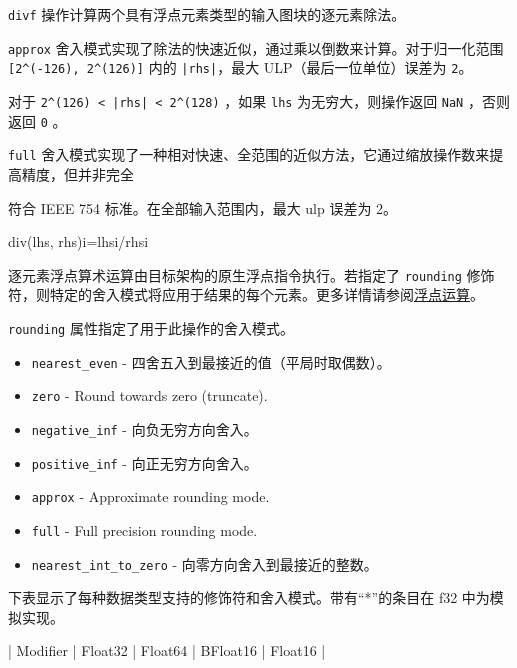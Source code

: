 \documentclass{article}
\begin{document}
\texttt{divf} 操作计算两个具有浮点元素类型的输入图块的逐元素除法。



\texttt{approx} 舍入模式实现了除法的快速近似，通过乘以倒数来计算。对于归一化范围 \texttt{[2\textasciicircum{}(-126), 2\textasciicircum{}(126)]} 内的 \texttt{|rhs|}，最大 ULP（最后一位单位）误差为 \texttt{2}。

对于 \texttt{2\textasciicircum{}(126) < |rhs| < 2\textasciicircum{}(128)} ，如果 \texttt{lhs} 为无穷大，则操作返回 \texttt{NaN} ，否则返回 \texttt{0} 。



\texttt{full} 舍入模式实现了一种相对快速、全范围的近似方法，它通过缩放操作数来提高精度，但并非完全

符合 IEEE 754 标准。在全部输入范围内，最大 ulp 误差为 2。



div(lhs, rhs)i=lhsi/rhsi


逐元素浮点算术运算由目标架构的原生浮点指令执行。若指定了 \texttt{rounding} 修饰符，则特定的舍入模式将应用于结果的每个元素。更多详情请参阅\href{https://docs.nvidia.com/cuda/tile-ir/latest/sections/operations.html#op-group-floating-point}{浮点运算}。



\texttt{rounding} 属性指定了用于此操作的舍入模式。



\begin{itemize}
\item \texttt{nearest\_even} - 四舍五入到最接近的值（平局时取偶数）。
\item \texttt{zero} - Round towards zero (truncate).

\item \texttt{negative\_inf} - 向负无穷方向舍入。
\item \texttt{positive\_inf} - 向正无穷方向舍入。
\item \texttt{approx} - Approximate rounding mode.

\item \texttt{full} - Full precision rounding mode.

\item \texttt{nearest\_int\_to\_zero} - 向零方向舍入到最接近的整数。


\end{itemize}
下表显示了每种数据类型支持的修饰符和舍入模式。带有``*''的条目在 f32 中为模拟实现。



| Modifier | Float32 | Float64 | BFloat16 | Float16 |
\end{document}
